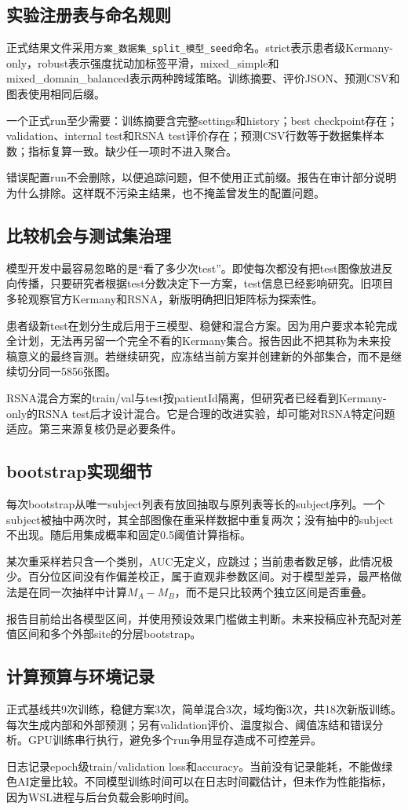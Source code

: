 \subsection{实验注册表与命名规则}

正式结果文件采用\texttt{方案\_数据集\_split\_模型\_seed}命名。strict表示患者级Kermany-only，robust表示强度扰动加标签平滑，mixed\_simple和mixed\_domain\_balanced表示两种跨域策略。训练摘要、评价JSON、预测CSV和图表使用相同后缀。

一个正式run至少需要：训练摘要含完整settings和history；best checkpoint存在；validation、internal test和RSNA test评价存在；预测CSV行数等于数据集样本数；指标复算一致。缺少任一项时不进入聚合。

错误配置run不会删除，以便追踪问题，但不使用正式前缀。报告在审计部分说明为什么排除。这样既不污染主结果，也不掩盖曾发生的配置问题。

\subsection{比较机会与测试集治理}

模型开发中最容易忽略的是“看了多少次test”。即使每次都没有把test图像放进反向传播，只要研究者根据test分数决定下一方案，test信息已经影响研究。旧项目多轮观察官方Kermany和RSNA，新版明确把旧矩阵标为探索性。

患者级新test在划分生成后用于三模型、稳健和混合方案。因为用户要求本轮完成全计划，无法再另留一个完全不看的Kermany集合。报告因此不把其称为未来投稿意义的最终盲测。若继续研究，应冻结当前方案并创建新的外部集合，而不是继续切分同一5856张图。

RSNA混合方案的train/val与test按patientId隔离，但研究者已经看到Kermany-only的RSNA test后才设计混合。它是合理的改进实验，却可能对RSNA特定问题适应。第三来源复核仍是必要条件。

\subsection{bootstrap实现细节}

每次bootstrap从唯一subject列表有放回抽取与原列表等长的subject序列。一个subject被抽中两次时，其全部图像在重采样数据中重复两次；没有抽中的subject不出现。随后用集成概率和固定0.5阈值计算指标。

某次重采样若只含一个类别，AUC无定义，应跳过；当前患者数足够，此情况极少。百分位区间没有作偏差校正，属于直观非参数区间。对于模型差异，最严格做法是在同一次抽样中计算$M_A-M_B$，而不是只比较两个独立区间是否重叠。

报告目前给出各模型区间，并使用预设效果门槛做主判断。未来投稿应补充配对差值区间和多个外部site的分层bootstrap。

\subsection{计算预算与环境记录}

正式基线共9次训练，稳健方案3次，简单混合3次，域均衡3次，共18次新版训练。每次生成内部和外部预测；另有validation评价、温度拟合、阈值冻结和错误分析。GPU训练串行执行，避免多个run争用显存造成不可控差异。

日志记录epoch级train/validation loss和accuracy。当前没有记录能耗，不能做绿色AI定量比较。不同模型训练时间可以在日志时间戳估计，但未作为性能指标，因为WSL进程与后台负载会影响时间。
